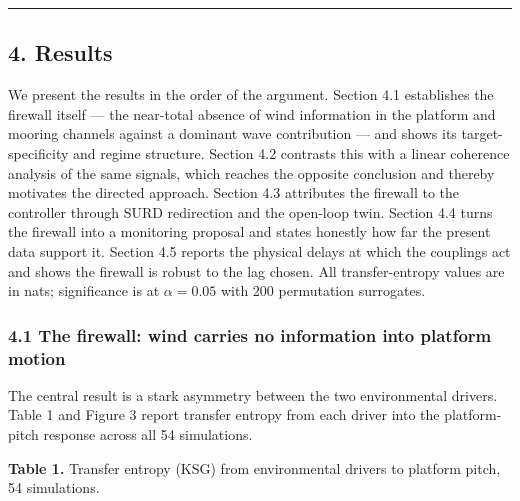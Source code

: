 \documentclass[
  english,
  11pt,
]{article}
\begin{document}
\begin{center}\rule{0.5\linewidth}{0.5pt}\end{center}

\subsection{4. Results}\label{results}

We present the results in the order of the argument. Section 4.1
establishes the firewall itself --- the near-total absence of wind
information in the platform and mooring channels against a dominant wave
contribution --- and shows its target-specificity and regime structure.
Section 4.2 contrasts this with a linear coherence analysis of the same
signals, which reaches the opposite conclusion and thereby motivates the
directed approach. Section 4.3 attributes the firewall to the controller
through SURD redirection and the open-loop twin. Section 4.4 turns the
firewall into a monitoring proposal and states honestly how far the
present data support it. Section 4.5 reports the physical delays at
which the couplings act and shows the firewall is robust to the lag
chosen. All transfer-entropy values are in nats; significance is at
\(\alpha = 0.05\) with 200 permutation surrogates.

\subsubsection{4.1 The firewall: wind carries no information into
platform
motion}\label{the-firewall-wind-carries-no-information-into-platform-motion}

The central result is a stark asymmetry between the two environmental
drivers. Table 1 and Figure 3 report transfer entropy from each driver
into the platform-pitch response across all 54 simulations.

\textbf{Table 1.} Transfer entropy (KSG) from environmental drivers to
platform pitch, 54 simulations.
\end{document}
